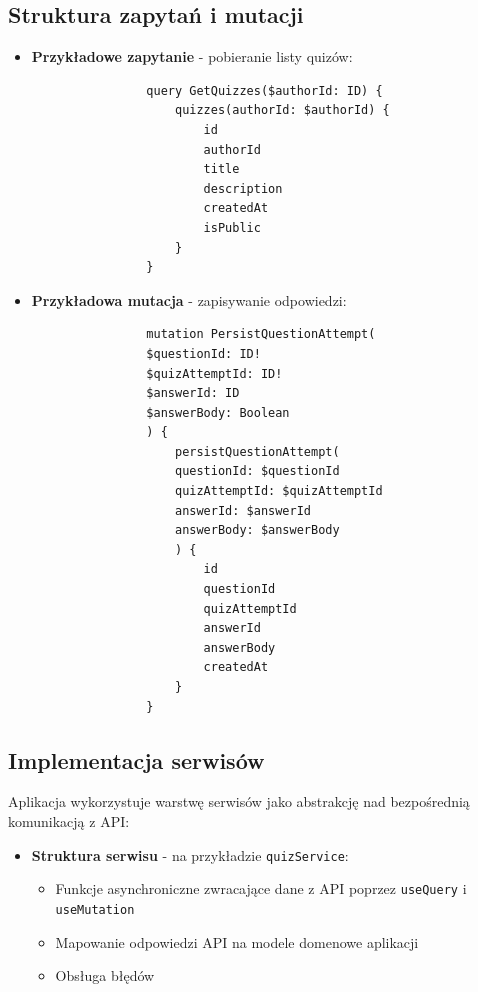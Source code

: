 \documentclass{article}
\begin{document}
        \subsection{Struktura zapytań i mutacji}
          \begin{itemize}
            
            \item \textbf{Przykładowe zapytanie} - pobieranie listy quizów:
              \begin{verbatim}
                query GetQuizzes($authorId: ID) {
                	quizzes(authorId: $authorId) {
                		id
                		authorId
                		title
                		description
                		createdAt
                		isPublic
                	}
                }
              \end{verbatim}
            
            \item \textbf{Przykładowa mutacja} - zapisywanie odpowiedzi:
              \begin{verbatim}
                mutation PersistQuestionAttempt(
                $questionId: ID!
                $quizAttemptId: ID!
                $answerId: ID
                $answerBody: Boolean
                ) {
                	persistQuestionAttempt(
                	questionId: $questionId
                	quizAttemptId: $quizAttemptId
                	answerId: $answerId
                	answerBody: $answerBody
                	) {
                		id
                		questionId
                		quizAttemptId
                		answerId
                		answerBody
                		createdAt
                	}
                }
              \end{verbatim}
          \end{itemize}
        
        \subsection{Implementacja serwisów}
          Aplikacja wykorzystuje warstwę serwisów jako abstrakcję nad bezpośrednią komunikacją z API:
          \begin{itemize}
            \item \textbf{Struktura serwisu} - na przykładzie \texttt{quizService}:
              \begin{itemize}
                \item Funkcje asynchroniczne zwracające dane z API poprzez \texttt{useQuery} i \texttt{useMutation}
                \item Mapowanie odpowiedzi API na modele domenowe aplikacji
                \item Obsługa błędów
              \end{itemize}
    
          \end{itemize}
   
\end{document}
